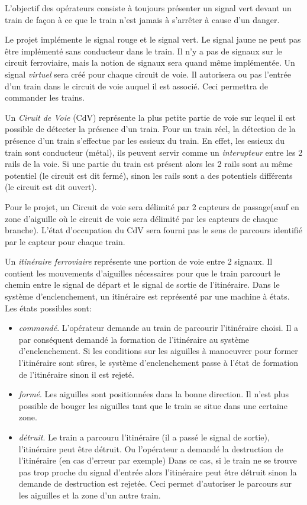 L'objectif des opérateurs consiste à toujours présenter un signal vert
devant un train de façon à ce que le train n'est jamais à s'arrêter à
cause d'un danger.


\medskip
Le projet implémente le signal rouge et le signal vert. Le signal
jaune ne peut pas être implémenté sans conducteur dans le train. Il
n'y a pas de signaux sur le circuit ferroviaire, mais la notion de
signaux sera quand même implémentée. Un signal \emph{virtuel} sera
créé pour chaque circuit de voie. Il autorisera ou pas l'entrée d'un
train dans le circuit de voie auquel il est associé.  Ceci permettra
de commander les trains. 

\medskip
Un \emph{Ciruit de Voie} (CdV) représente la plus petite partie de
voie sur lequel il est possible de détecter la présence d'un
train. Pour un train réel, la détection de la présence d'un train
s'effectue par les essieux du train. En effet, les essieux du train
sont conducteur (métal), ils peuvent servir comme un
\emph{interupteur} entre les 2 rails de la voie. Si une partie du
train est présent alors les 2 rails sont au même potentiel (le circuit
est dit fermé), sinon les rails sont a des potentiels différents (le
circuit est dit ouvert).

\medskip
Pour le projet, un Circuit de voie sera délimité par 2 capteurs de
passage(sauf en zone d'aiguille où le circuit de voie sera délimité
par les capteurs de chaque branche). L'état d'occupation du CdV sera
fourni pas le sens de parcours identifié par le capteur pour chaque
train.

\medskip
Un \emph{itinéraire ferroviaire} représente une portion de voie entre
2 signaux. Il contient les mouvements d’aiguilles nécessaires pour que
le train parcourt le chemin entre le signal de départ et le signal de
sortie de l'itinéraire. Dans le système d'enclenchement, un itinéraire
est représenté par une machine à états. Les états possibles sont:
\begin{itemize}
\item \emph{commandé}. L’opérateur demande au train de parcourir
  l’itinéraire choisi. Il a par conséquent demandé la formation de
  l’itinéraire au système d’enclenchement. Si les conditions sur les
  aiguilles à manoeuvrer pour former l’itinéraire sont sûres, le
  système d’enclenchement passe à l’état de formation de l’itinéraire
  sinon il est rejeté.
\item \emph{formé}. Les aiguilles sont positionnées dans la bonne
  direction. Il n’est plus possible de bouger les aiguilles tant que
  le train se situe dans une certaine zone.
\item \emph{détruit}. Le train a parcouru l’itinéraire (il a passé le
  signal de sortie), l'itinéraire peut être détruit. Ou l'opérateur a
  demandé la destruction de l'itinéraire (en cas d'erreur par exemple)
  Dans ce cas, si le train ne se trouve pas trop proche du signal
  d'entrée alors l'itinéraire peut être détruit sinon la demande de
  destruction est rejetée.  Ceci permet d'autoriser le parcours sur
  les aiguilles et la zone d’un autre train.
\end{itemize}


